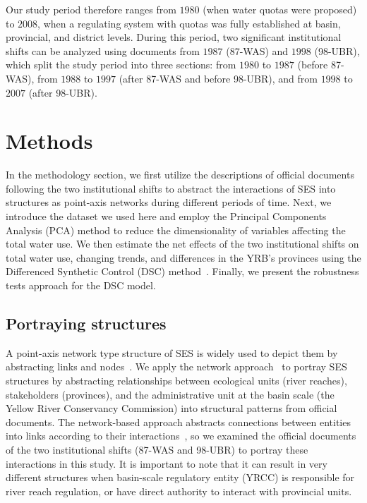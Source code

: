 \documentclass[preprint, 12pt]{elsarticle}
\begin{document}
Our study period therefore ranges from $1980$ (when water quotas were proposed) to $2008$, when a regulating system with quotas was fully established at basin, provincial, and district levels.
During this period, two significant institutional shifts can be analyzed using documents from $1987$ (87-WAS) and $1998$ (98-UBR), which split the study period into three sections: from $1980$ to $1987$ (before 87-WAS), from $1988$ to $1997$ (after 87-WAS and before 98-UBR), and from $1998$ to $2007$ (after 98-UBR).

\section{Methods}\label{sec:methods}


In the methodology section, we first utilize the descriptions of official documents following the two institutional shifts to abstract the interactions of SES into structures as point-axis networks during different periods of time.
Next, we introduce the dataset we used here and employ the Principal Components Analysis (PCA) method to reduce the dimensionality of variables affecting the total water use.
We then estimate the net effects of the two institutional shifts on total water use, changing trends, and differences in the YRB's provinces using the Differenced Synthetic Control (DSC) method~\cite{arkhangelsky2021}.
Finally, we present the robustness tests approach for the DSC model.


\subsection{Portraying structures}\label{sec:structures}
A point-axis network type structure of SES is widely used to depict them by abstracting links and nodes~\cite{wang2022g,bodin2017a,kluger2020,guerrero2015}.
We apply the network approach~\cite{bodin2017b} to portray SES structures by abstracting relationships between ecological units (river reaches), stakeholders (provinces), and the administrative unit at the basin scale (the Yellow River Conservancy Commission) into structural patterns from official documents.
The network-based approach abstracts connections between entities into links according to their interactions~\cite{bodin2017a,kluger2020,guerrero2015}, so we examined the official documents of the two institutional shifts (87-WAS and 98-UBR) to portray these interactions in this study.
It is important to note that it can result in very different structures when basin-scale regulatory entity (YRCC) is responsible for river reach regulation, or have direct authority to interact with provincial units.
\end{document}
